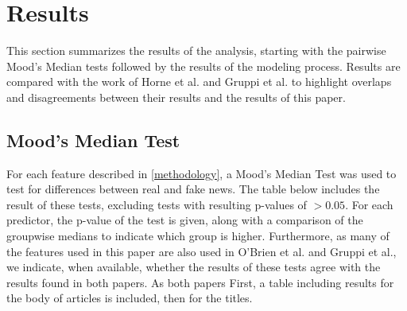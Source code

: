 \documentclass[../thesis.tex]{subfiles}
\begin{document}
\chapter{Results}
\label{ch:results}

This section summarizes the results of the analysis, starting with the pairwise Mood's Median tests followed by the results of the modeling process. Results are compared with the work of Horne et al. and Gruppi et al. to highlight overlaps and disagreements between their results and the results of this paper.

\section{Mood's Median Test}

For each feature described in \ref{methodology}, a Mood's Median Test was used to test for differences between real and fake news. The table below includes the result of these tests, excluding tests with resulting p-values of $>0.05$. For each predictor, the p-value of the test is given, along with a comparison of the groupwise medians to indicate which group is higher. Furthermore, as many of the features used in this paper are also used in O'Brien et al. and Gruppi et al., we indicate, when available, whether the results of these tests agree with the results found in both papers. As both papers First, a table including results for the body of articles is included, then for the titles. 
\end{document}
